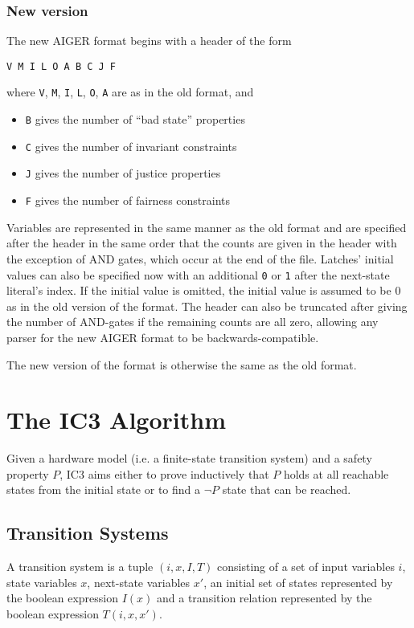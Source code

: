 \documentclass[12pt,a4paper,twoside,openright]{report}
\begin{document}
\subsubsection{New version}

The new AIGER format begins with a header of the form
\begin{verbatim}
V M I L O A B C J F
\end{verbatim}
where \verb,V,, \verb,M,, \verb,I,, \verb,L,, \verb,O,, \verb,A, are as
in the old format, and
\begin{itemize}
\item \verb,B, gives the number of ``bad state'' properties
\item \verb,C, gives the number of invariant constraints
\item \verb,J, gives the number of justice properties
\item \verb,F, gives the number of fairness constraints
\end{itemize}

Variables are represented in the same manner as the old format
and are specified after the header in the same order that the counts
are given in the header with the exception of AND gates, which
occur at the end of the file. Latches' initial values can also be specified
now with an additional \verb,0, or \verb,1, after the next-state literal's
index. If the initial value is omitted, the initial value is assumed to be
0 as in the old version of the format. The header can also be truncated
after giving the number of AND-gates if the remaining counts are all
zero, allowing any parser for the new AIGER format to be
backwards-compatible.

The new version of the format is otherwise
the same as the old format.

\section{The IC3 Algorithm}
Given a hardware model (i.e. a finite-state transition system) and a
safety property $P$, IC3 aims either to prove inductively that $P$ holds
at all reachable states from the initial state or
to find a $\neg P$ state that can be reached.

\subsection{Transition Systems}
A transition system is a tuple $(i,x,I,T)$ consisting of a set of input
variables $i$, state variables $x$, next-state variables $x'$, an initial
set of states represented by the boolean expression $I(x)$ and
a transition relation represented by the boolean expression $T(i,x,x')$.
\end{document}
